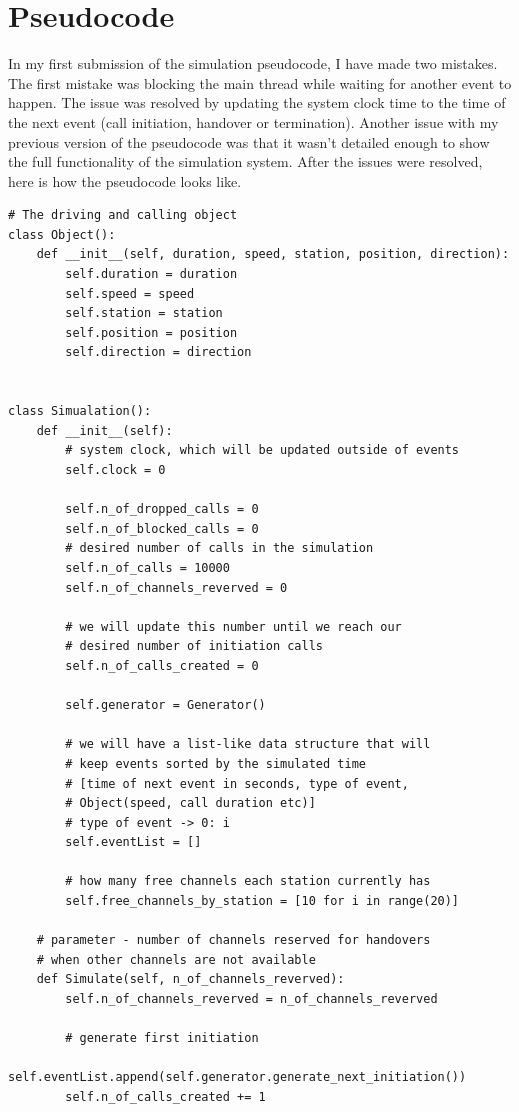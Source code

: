 \documentclass[12pt,a4paper]{article}
\begin{document}
\section{Pseudocode}
In my first submission of the simulation pseudocode, I have made two mistakes. The first mistake was blocking the main thread while waiting for another event to happen. The issue was resolved by updating the system clock time to the time of the next event (call initiation, handover or termination). Another issue with my previous version of the pseudocode was that it wasn't detailed enough to show the full functionality of the simulation system. After the issues were resolved, here is how the pseudocode looks like.
\begin{lstlisting}
# The driving and calling object
class Object():
    def __init__(self, duration, speed, station, position, direction):
        self.duration = duration
        self.speed = speed
        self.station = station
        self.position = position
        self.direction = direction


class Simualation():
    def __init__(self):
        # system clock, which will be updated outside of events
        self.clock = 0

        self.n_of_dropped_calls = 0
        self.n_of_blocked_calls = 0
        # desired number of calls in the simulation
        self.n_of_calls = 10000
        self.n_of_channels_reverved = 0

        # we will update this number until we reach our
        # desired number of initiation calls
        self.n_of_calls_created = 0

        self.generator = Generator()

        # we will have a list-like data structure that will
        # keep events sorted by the simulated time
        # [time of next event in seconds, type of event,
        # Object(speed, call duration etc)]
        # type of event -> 0: i
        self.eventList = []

        # how many free channels each station currently has
        self.free_channels_by_station = [10 for i in range(20)]

    # parameter - number of channels reserved for handovers
    # when other channels are not available
    def Simulate(self, n_of_channels_reverved):
        self.n_of_channels_reverved = n_of_channels_reverved

        # generate first initiation
        self.eventList.append(self.generator.generate_next_initiation())
        self.n_of_calls_created += 1


\end{lstlisting}
\end{document}
